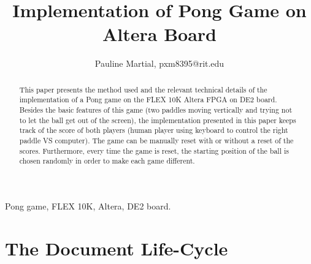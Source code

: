 \documentclass[%
	final,
	notitlepage,
	narroweqnarray,
	inline,
	twoside,
	]{ieee}
\begin{document}
\title{Implementation of Pong Game on Altera Board}

\author{Pauline Martial, pxm8395@rit.edu}



\maketitle               

\begin{abstract} 
This paper presents the method used and the relevant technical details of the implementation of a Pong game on the FLEX 10K Altera FPGA on DE2 board. Besides the basic features of this game (two paddles moving vertically and trying not to let the ball get out of the screen), the implementation presented in this paper keeps track of the score of both players (human player using keyboard to control the right paddle VS computer). The game can be manually reset with or without a reset of the scores. Furthermore, every time the game is reset, the starting position of the ball is chosen randomly in order to make each game different. \\



\end{abstract}

\begin{keywords}
Pong game, FLEX 10K, Altera, DE2 board.
\end{keywords}


\section{The Document Life-Cycle}
\end{document}
